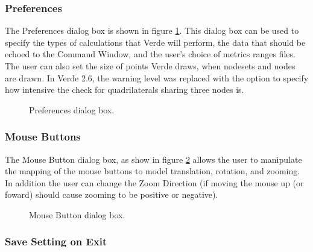 \documentclass[10pt]{report}
\begin{document}
\subsubsection{Preferences}
\label{preferences}

The Preferences dialog box is shown in figure \ref{fig:preferences}.  
This dialog box can 
be used to specify the types of calculations that Verde will perform, 
the data that should 
be echoed to the Command Window, and the user's choice of metrics 
ranges files.  The user can also set the size of points Verde draws, when
nodesets and nodes are drawn.
In Verde 2.6, the warning level was replaced with the option to specify
how intensive the check for quadrilaterals sharing three nodes is.

\htmlrule
\begin{figure}[tbh]
  \begin{center}
              {}
    \caption{Preferences dialog box.}
    \label{fig:preferences}
  \end{center}
\end{figure}     

\subsubsection{Mouse Buttons}
\label{mouse_buttons}

The Mouse Button dialog box, as show in figure \ref{fig:mouse_buttons} 
allows the user to manipulate the mapping of the mouse buttons to model 
translation, rotation, and zooming.  In addition the user can change 
the Zoom Direction (if moving the mouse up (or foward) should cause zooming 
to be positive or negative).


\htmlrule
\begin{figure}[tbh]
  \begin{center}
              {}
    \caption{Mouse Button dialog box.}
    \label{fig:mouse_buttons}
  \end{center}
\end{figure}     


\subsubsection{Save Setting on Exit}
\label{save_settings}
\end{document}
